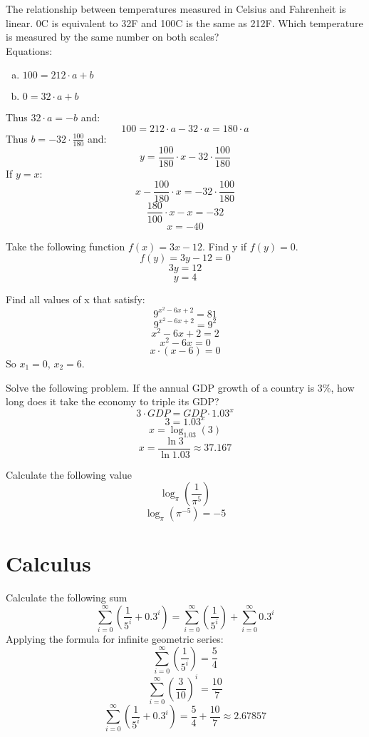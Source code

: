\documentclass[10pt]{article}
\newenvironment{problem}[2][Problem]{\begin{trivlist}
\item[\hskip \labelsep {\bfseries #1}\hskip \labelsep {\bfseries #2.}]}{\end{trivlist}}
\begin{document}
\begin{problem}{2.1 (Based on SYD 2.5.6)}
The relationship between temperatures measured in Celsius and Fahrenheit is linear. 0\degree C is equivalent to 32\degree F and 100\degree C is the same as 212\degree F.
 Which temperature is measured by the same number on both scales? 
\medskip \\
Equations:
\begin{enumerate}[(a)]
	\item $100 = 212 \cdot a + b$
	\item $0 = 32 \cdot a + b$
\end{enumerate}
Thus $32 \cdot a = -b$ and:
$$ 100 = 212\cdot a - 32\cdot a = 180\cdot a$$
Thus $b = -32\cdot \frac{100}{180}$ and:
$$ y = \frac{100}{180} \cdot x - 32\cdot \frac{100}{180}$$
If $y = x$:
$$ x - \frac{100}{180}\cdot x = -32\cdot \frac{100}{180}$$
$$ \frac{180}{100}\cdot x - x = -32 $$
$$ x = -40$$
 
\end{problem}

\begin{problem}{2.2}
Take the following function $f(x)=3x-12$. Find y if $f(y)=0$.
$$f(y) = 3y-12 = 0$$
$$3y = 12$$
$$y = 4$$
\end{problem}

\begin{problem}{2.3}
Find all values of x that satisfy:
$$9^{x^2-6x+2}=81$$
$$9^{x^2-6x+2} = 9^2$$
$$x^2-6x+2 = 2$$
$$x^2-6x = 0$$
$$x\cdot (x-6) = 0$$
So $x_1 = 0$, $x_2 = 6$.
\end{problem}

\begin{problem}{2.4}
Solve the following problem. If the annual GDP growth of a country is 3\%, how long does it take the economy to triple its GDP?
$$ 3\cdot GDP = GDP\cdot 1.03^x $$
$$ 3 = 1.03^x $$
$$ x = \log_{1.03}(3)$$
$$ x = \frac{\ln{3}}{\ln{1.03}} \approx 37.167$$
\end{problem}

\begin{problem}{2.5}
Calculate the following value
$$\log_{\pi}\left(\frac{1}{\pi^5} \right)$$
$$\log_{\pi}\left(\pi^{-5} \right) = -5 $$
\end{problem}

\section{Calculus}

\begin{problem}{3.1}
Calculate the following sum
$$\sum\limits_{i=0}^{\infty} \left( \frac{1}{5^i}+0.3^i\right) = \sum\limits_{i=0}^{\infty} \left( \frac{1}{5^i}\right) + \sum\limits_{i=0}^{\infty} 0.3^i$$
Applying the formula for infinite geometric series:
$$\sum\limits_{i=0}^{\infty} \left( \frac{1}{5^i}\right) = \frac{5}{4}$$
$$\sum\limits_{i=0}^{\infty} \left( \frac{3}{10} \right)^i = \frac{10}{7}$$
$$\sum\limits_{i=0}^{\infty} \left( \frac{1}{5^i}+0.3^i\right) = \frac{5}{4}+\frac{10}{7} \approx 2.67857$$
\end{problem}
\end{document}
